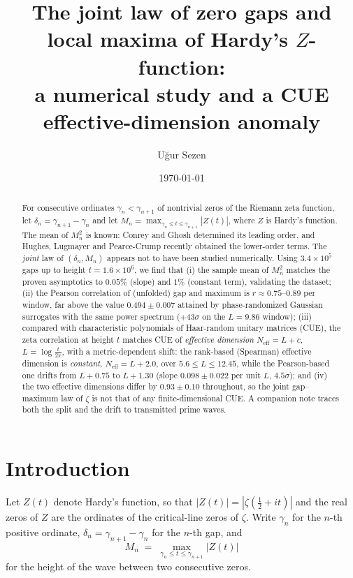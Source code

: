 \documentclass[12pt]{amsart}
\title[Zero gaps and local maxima of Hardy's $Z$-function]{The joint law
of zero gaps and local maxima of Hardy's $Z$-function:\\ a numerical study
and a CUE effective-dimension anomaly}
\author{U\u{g}ur Sezen}
\date{\today}
\begin{document}
\begin{abstract}
For consecutive ordinates $\gamma_n < \gamma_{n+1}$ of nontrivial zeros of
the Riemann zeta function, let $\delta_n = \gamma_{n+1}-\gamma_n$ and let
$M_n = \max_{\gamma_n \le t \le \gamma_{n+1}} |Z(t)|$, where $Z$ is Hardy's
function. The mean of $M_n^2$ is known: Conrey and Ghosh determined its
leading order, and Hughes, Lugmayer and Pearce-Crump recently obtained the
lower-order terms. The \emph{joint} law of $(\delta_n, M_n)$ appears not to
have been studied numerically. Using $3.4\times 10^5$ gaps up to height
$t = 1.6\times 10^6$, we find that (i) the sample mean of $M_n^2$ matches
the proven asymptotics to $0.05\%$ (slope) and $1\%$ (constant term),
validating the dataset; (ii) the Pearson correlation of (unfolded) gap and
maximum is $r \approx 0.75$--$0.89$ per window, far above the value
$0.494\pm0.007$ attained by phase-randomized Gaussian surrogates with the
same power spectrum ($+43\sigma$ on the $L=9.86$ window); (iii) compared with characteristic
polynomials of Haar-random unitary matrices (CUE), the zeta correlation at
height $t$ matches CUE of \emph{effective dimension}
$N_{\mathrm{eff}} = L + c$, $L=\log\frac{t}{2\pi}$, with
a metric-dependent shift: the rank-based (Spearman) effective dimension is
\emph{constant}, $N_{\mathrm{eff}} = L + 2.0$, over $5.6 \le L \le 12.45$,
while the Pearson-based one drifts from $L + 0.75$ to $L + 1.30$ (slope
$0.098 \pm 0.022$ per unit $L$, $4.5\sigma$); and (iv) the two effective
dimensions differ by $0.93 \pm 0.10$ throughout, so the joint gap--maximum
law of $\zeta$ is not that of any finite-dimensional CUE. A companion note
traces both the split and the drift to transmitted prime waves.
\end{abstract}

\maketitle

\section{Introduction}

Let $Z(t)$ denote Hardy's function, so that $|Z(t)| = |\zeta(\tfrac12+it)|$
and the real zeros of $Z$ are the ordinates of the critical-line zeros of
$\zeta$. Write $\gamma_n$ for the $n$-th positive ordinate,
$\delta_n = \gamma_{n+1} - \gamma_n$ for the $n$-th gap, and
\[
M_n \;=\; \max_{\gamma_n \le t \le \gamma_{n+1}} |Z(t)|
\]
for the height of the wave between two consecutive zeros.
\end{document}
